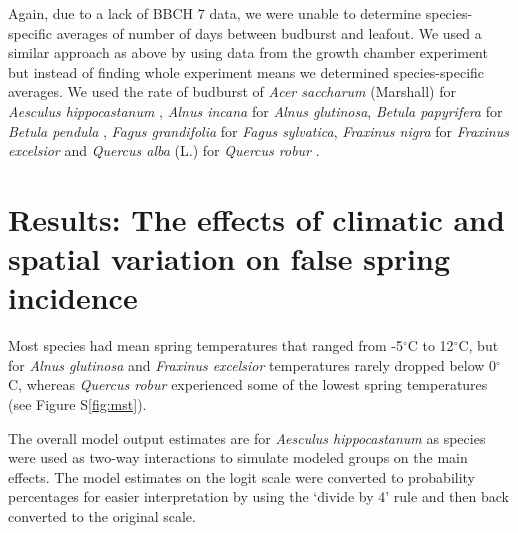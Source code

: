\documentclass{article}\usepackage[]{graphicx}\usepackage[]{color}
\begin{document}
{Again, due to a lack of BBCH 7 data, we were unable to determine species-specific averages of number of days between budburst and leafout. We used a similar approach as above by using data from the growth chamber experiment \citep{Flynn2018} but instead of finding whole experiment means we determined species-specific averages. We used the rate of budburst of \textit{Acer saccharum} (Marshall) for \textit{Aesculus hippocastanum} \citep{Buerki2010}, \textit{Alnus incana} for \textit{Alnus glutinosa}, \textit{Betula papyrifera} for \textit{Betula pendula} \citep{Wang2016}, \textit{Fagus grandifolia} for \textit{Fagus sylvatica}, \textit{Fraxinus nigra} for \textit{Fraxinus excelsior} and \textit{Quercus alba} (L.) for \textit{Quercus robur} \citep{Hipp2017}.

\section*{Results: The effects of climatic and spatial variation on false spring incidence}
Most species had mean spring temperatures that ranged from -5$^{\circ}$C to 12$^{\circ}$C, but for \textit{Alnus glutinosa} and \textit{Fraxinus excelsior} temperatures rarely dropped below 0$^{\circ}$C, whereas \textit{Quercus robur} experienced some of the lowest spring temperatures (see Figure S\ref{fig:mst}). 

The overall model output estimates are for \textit{Aesculus hippocastanum} as species were used as two-way interactions to simulate modeled groups on the main effects. The model estimates on the logit scale were converted to probability percentages for easier interpretation by using the `divide by 4' rule \citep{Gelman2006} and then back converted to the original scale. %

}
\end{document}

